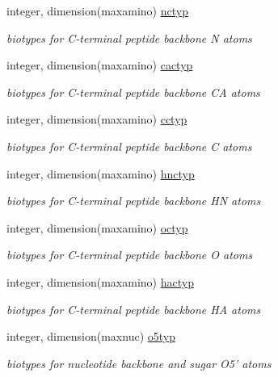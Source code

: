 \begin{DoxyCompactItemize}
integer, dimension(maxamino) \hyperlink{classresdue_a70d0e2e9c1996d537b7753aec59e0c8d}{nctyp}
\begin{DoxyCompactList}\small\item\em biotypes for C-\/terminal peptide backbone N atoms \end{DoxyCompactList}\item 
integer, dimension(maxamino) \hyperlink{classresdue_a7800b2083dda453b03ca0b1518245bb0}{cactyp}
\begin{DoxyCompactList}\small\item\em biotypes for C-\/terminal peptide backbone C\-A atoms \end{DoxyCompactList}\item 
integer, dimension(maxamino) \hyperlink{classresdue_a9693e50a65750bbb7dec2cdae61254d3}{cctyp}
\begin{DoxyCompactList}\small\item\em biotypes for C-\/terminal peptide backbone C atoms \end{DoxyCompactList}\item 
integer, dimension(maxamino) \hyperlink{classresdue_a35d2eabf774d188c40965ae2b6f74d82}{hnctyp}
\begin{DoxyCompactList}\small\item\em biotypes for C-\/terminal peptide backbone H\-N atoms \end{DoxyCompactList}\item 
integer, dimension(maxamino) \hyperlink{classresdue_ad241d88a4adc78b939a86353ebf03140}{octyp}
\begin{DoxyCompactList}\small\item\em biotypes for C-\/terminal peptide backbone O atoms \end{DoxyCompactList}\item 
integer, dimension(maxamino) \hyperlink{classresdue_ae87374ba5c19bd0b66fe871dbbdcc26e}{hactyp}
\begin{DoxyCompactList}\small\item\em biotypes for C-\/terminal peptide backbone H\-A atoms \end{DoxyCompactList}\item 
integer, dimension(maxnuc) \hyperlink{classresdue_a6a04dafa45afb5a8adf89f18467afb4a}{o5typ}
\begin{DoxyCompactList}\small\item\em biotypes for nucleotide backbone and sugar O5' atoms \end{DoxyCompactList}\item 

\end{DoxyCompactItemize}
